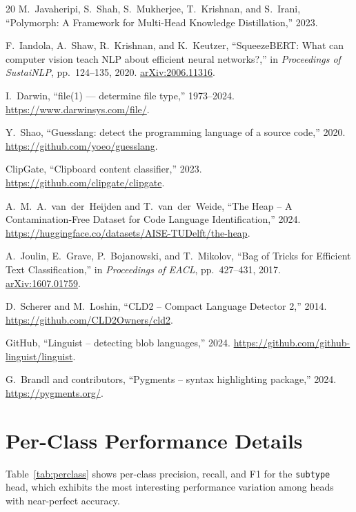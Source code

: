 \documentclass[11pt,a4paper]{article}
\begin{document}
\begin{thebibliography}{20}
M.~Javaheripi, S.~Shah, S.~Mukherjee, T.~Krishnan, and S.~Irani,
``Polymorph: A Framework for Multi-Head Knowledge Distillation,'' 2023.

F.~Iandola, A.~Shaw, R.~Krishnan, and K.~Keutzer, ``SqueezeBERT: What can
computer vision teach NLP about efficient neural networks?,'' in
\emph{Proceedings of SustaiNLP}, pp.~124--135, 2020.
\href{https://arxiv.org/abs/2006.11316}{arXiv:2006.11316}.

I.~Darwin, ``file(1) --- determine file type,'' 1973--2024.
\url{https://www.darwinsys.com/file/}.

Y.~Shao, ``Guesslang: detect the programming language of a source code,''
2020. \url{https://github.com/yoeo/guesslang}.

ClipGate, ``Clipboard content classifier,'' 2023.
\url{https://github.com/clipgate/clipgate}.

A.~M.~A.~van~der~Heijden and T.~van~der~Weide, ``The Heap -- A Contamination-Free
Dataset for Code Language Identification,'' 2024.
\url{https://huggingface.co/datasets/AISE-TUDelft/the-heap}.

A.~Joulin, E.~Grave, P.~Bojanowski, and T.~Mikolov, ``Bag of Tricks for Efficient
Text Classification,'' in \emph{Proceedings of EACL}, pp.~427--431, 2017.
\href{https://arxiv.org/abs/1607.01759}{arXiv:1607.01759}.

D.~Scherer and M.~Loshin, ``CLD2 -- Compact Language Detector 2,''
2014. \url{https://github.com/CLD2Owners/cld2}.

GitHub, ``Linguist -- detecting blob languages,''
2024. \url{https://github.com/github-linguist/linguist}.

G.~Brandl and contributors, ``Pygments -- syntax highlighting package,''
2024. \url{https://pygments.org/}.

\end{thebibliography}

\appendix

\section{Per-Class Performance Details}
\label{app:perclass}

Table~\ref{tab:perclass} shows per-class precision, recall, and F1 for the \texttt{subtype} head, which exhibits the most interesting performance variation among heads with near-perfect accuracy.
\end{document}
